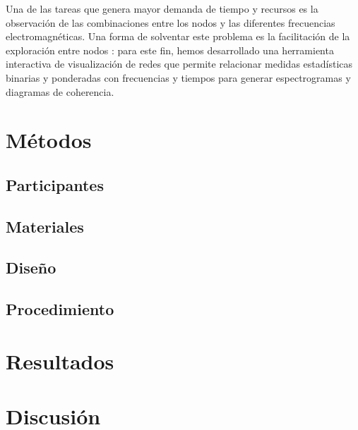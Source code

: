 \documentclass[jou]{apa6}
\begin{document}
Una de las tareas que genera mayor demanda de tiempo y recursos es la observación de las combinaciones entre los nodos
y las diferentes frecuencias electromagnéticas. Una forma de solventar este problema es la facilitación de la 
exploración entre nodos \parencite{Massimini2228}: para este fin, hemos desarrollado una herramienta interactiva 
de visualización de redes que permite relacionar medidas estadísticas binarias y ponderadas con frecuencias y 
tiempos para generar espectrogramas y diagramas de coherencia.

\section{Métodos}
\subsection{Participantes}

\subsection{Materiales}
\subsection{Diseño}
\subsection{Procedimiento}
\section{Resultados}
\section{Discusión}
\printbibliography
\end{document}
